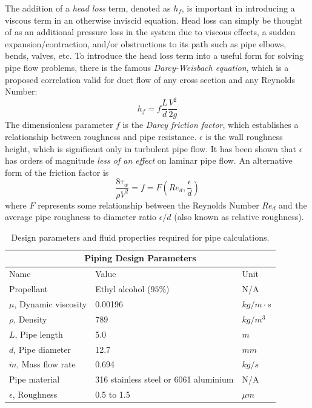 \documentclass[9pt]{article} %
\numberwithin{equation}{section} %
\begin{document}
The addition of a \textit{head loss} term, denoted as $h_{f}$, is important in introducing a viscous term in an otherwise inviscid equation. Head loss can simply be thought of as an additional pressure loss in the system due to viscous effects, a sudden expansion/contraction, and/or obstructions to its path such as pipe elbows, bends, valves, etc. To introduce the head loss term into a useful form for solving pipe flow problems, there is the famous \textit{Darcy-Weisbach equation}, which is a proposed correlation valid for duct flow of any cross section and any Reynolds Number:
\begin{equation} \label{eq:darcy-weisbach}
h_{f} = f{\frac{L}{d}}{\frac{V^{2}}{2{g}}}
\end{equation}
The dimensionless parameter $f$ is the \textit{Darcy friction factor}, which establishes a relationship between roughness and pipe resistance. $\epsilon$ is the wall roughness height, which is significant only in turbulent pipe flow. It has been shown that $\epsilon$ has orders of magnitude \textit{less of an effect} on laminar pipe flow. An alternative form of the friction factor is
\begin{equation} \label{eq:darcy-friction}
\frac{8 \tau_{w}}{\rho V^{2}} = f = F(Re_{d}, \frac{\epsilon}{d})
\end{equation}
where $F$ represents some relationship between the Reynolds Number $Re_{d}$ and the average pipe roughness to diameter ratio $\epsilon / d$ (also known as relative roughness).

\begin{table}[!htb]
\centering
\begin{tabular}{ |p{4cm}||p{6cm}|p{2cm}|  }
\hline
\multicolumn{3}{|c|}{Piping Design Parameters} \\
\hline
Name & Value & Unit \\
\hline
Propellant  &  Ethyl alcohol ($95\%$)   &  N/A \\
$\mu$, Dynamic viscosity  &  0.00196  &  $kg/m \cdot s$ \\
$\rho$, Density  &  789  &  $kg/m^{3}$ \\
$L$, Pipe length  &  5.0  &  $m$   \\
$d$, Pipe diameter  &  12.7  &  $mm$ \\
$\dot{m}$, Mass flow rate  &  0.694  &  $kg/s$ \\
Pipe material  &  316 stainless steel or 6061 aluminium  &  N/A  \\
$\epsilon$, Roughness  &  0.5 to 1.5  &  $\mu m$  \\
\hline
\end{tabular}
\caption{Design parameters and fluid properties required for pipe calculations.}
\label{table:piping_parameters}
\end{table}
\end{document}
